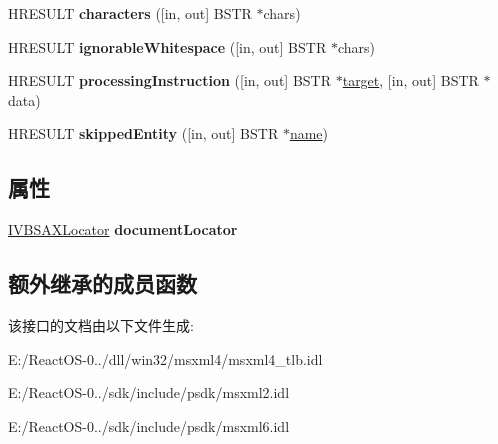 \begin{DoxyCompactItemize}
H\+R\+E\+S\+U\+LT {\bfseries characters} (\mbox{[}in, out\mbox{]} B\+S\+TR $\ast$chars)
\item 
\mbox{\label{interface_m_s_x_m_l2_1_1_i_v_b_s_a_x_content_handler_a6f772025f033461add8d1f051302e598}} 
H\+R\+E\+S\+U\+LT {\bfseries ignorable\+Whitespace} (\mbox{[}in, out\mbox{]} B\+S\+TR $\ast$chars)
\item 
\mbox{\label{interface_m_s_x_m_l2_1_1_i_v_b_s_a_x_content_handler_aa61da9f3a6b8ba5e8aaa4f928bed0111}} 
H\+R\+E\+S\+U\+LT {\bfseries processing\+Instruction} (\mbox{[}in, out\mbox{]} B\+S\+TR $\ast$\hyperlink{interfacevoid}{target}, \mbox{[}in, out\mbox{]} B\+S\+TR $\ast$data)
\item 
\mbox{\label{interface_m_s_x_m_l2_1_1_i_v_b_s_a_x_content_handler_a27fd4e49c8f5f107f282586723985d69}} 
H\+R\+E\+S\+U\+LT {\bfseries skipped\+Entity} (\mbox{[}in, out\mbox{]} B\+S\+TR $\ast$\hyperlink{structname}{name})
\end{DoxyCompactItemize}
\subsection*{属性}
\begin{DoxyCompactItemize}
\item 
\mbox{\label{interface_m_s_x_m_l2_1_1_i_v_b_s_a_x_content_handler_a21304d338ac1e8481311dbe6c3880297}} 
\hyperlink{interface_m_s_x_m_l2_1_1_i_v_b_s_a_x_locator}{I\+V\+B\+S\+A\+X\+Locator} {\bfseries document\+Locator}
\end{DoxyCompactItemize}
\subsection*{额外继承的成员函数}


该接口的文档由以下文件生成\+:\begin{DoxyCompactItemize}
\item 
E\+:/\+React\+O\+S-\/0../dll/win32/msxml4/msxml4\+\_\+tlb.\+idl\item 
E\+:/\+React\+O\+S-\/0../sdk/include/psdk/msxml2.\+idl\item 
E\+:/\+React\+O\+S-\/0../sdk/include/psdk/msxml6.\+idl\end{DoxyCompactItemize}
